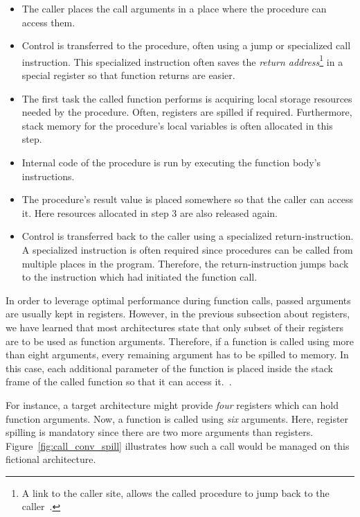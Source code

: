 \begin{itemize}
	\item The caller places the call arguments in a place where the procedure can access them.
	\item Control is transferred to the procedure, often using a jump or specialized call instruction.
	      This specialized instruction often saves the \emph{return address}\footnote{A link to the caller site, allows the called procedure to jump back to the caller~\cite[p.~99]{Patterson2017-zq}.} in a special register so that function returns are easier.
	\item The first task the called function performs is acquiring local storage resources needed by the procedure.
	      Often, registers are spilled if required.
	      Furthermore, stack memory for the procedure's local variables is often allocated in this step.
	\item Internal code of the procedure is run by executing the function body's instructions.
	\item The procedure's result value is placed somewhere so that the caller can access it.
	      Here resources allocated in step 3 are also released again.
	\item Control is transferred back to the caller using a specialized return-instruction.
	      A specialized instruction is often required since procedures can be called from multiple places in the program.
	      Therefore, the return-instruction jumps back to the instruction which had initiated the function call.
\end{itemize}

In order to leverage optimal performance during function calls, passed arguments are usually kept in registers.
However, in the previous subsection about registers, we have learned that most architectures state that only subset of their registers are to be used as function arguments.
Therefore, if a function is called using more than eight arguments, every remaining argument has to be spilled to memory.
In this case, each additional parameter of the function is placed inside the stack frame of the called function so that it can access it.~\cite[p.~98]{Patterson2017-zq}.

For instance, a target architecture might provide \emph{four} registers which can hold function arguments.
Now, a function is called using \emph{six} arguments.
Here, register spilling is mandatory since there are two more arguments than registers.
Figure~\ref{fig:call_conv_spill} illustrates how such a call would be managed on this fictional architecture.

